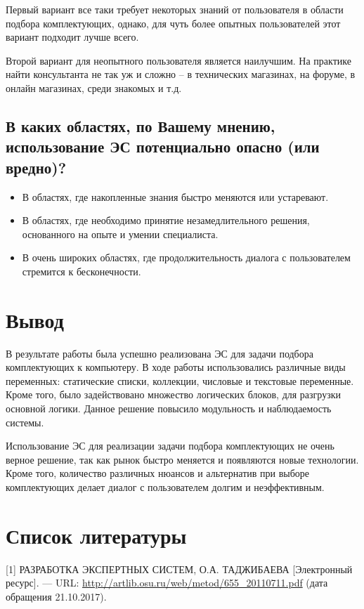 \documentclass[14pt,a4paper,report]{report}
\begin{document}
Первый вариант все таки требует некоторых знаний от пользователя в области подбора комплектующих, однако, для чуть более опытных пользователей этот вариант подходит лучше всего.

Второй вариант для неопытного пользователя является наилучшим. На практике найти консультанта не так уж и сложно -- в технических магазинах, на форуме, в онлайн магазинах, среди знакомых и т.д.

\subsection{В каких областях, по Вашему мнению, использование ЭС потенциально опасно (или вредно)?}

\begin{itemize}
	\item В областях, где накопленные знания быстро меняются или устаревают.
	\item В областях, где необходимо принятие незамедлительного решения, основанного на опыте и умении специалиста.
	\item В очень широких областях, где продолжительность диалога с пользователем стремится к бесконечности.
\end{itemize}

\section{Вывод}

В результате работы была успешно реализована ЭС для задачи подбора комплектующих к компьютеру. В ходе работы использовались различные виды переменных: статические списки, коллекции, числовые и текстовые переменные. Кроме того, было задействовано множество логических блоков, для разгрузки основной логики. Данное решение повысило модульность и наблюдаемость системы.

Использование ЭС для реализации задачи подбора комплектующих не очень верное решение, так как рынок быстро меняется и появляются новые технологии. Кроме того, количество различных нюансов и альтернатив при выборе комплектующих делает диалог с пользователем долгим и неэффективным.

\section{Список литературы}


\begin{flushleft}
	
[1] РАЗРАБОТКА ЭКСПЕРТНЫХ СИСТЕМ, О.А. ТАДЖИБАЕВА [Электронный ресурс]. — URL: \href{http://artlib.osu.ru/web/metod/655_20110711.pdf}{http://artlib.osu.ru/web/metod/655\_20110711.pdf} (дата обращения 21.10.2017). \linebreak

\end{flushleft}
	
\end{document}

